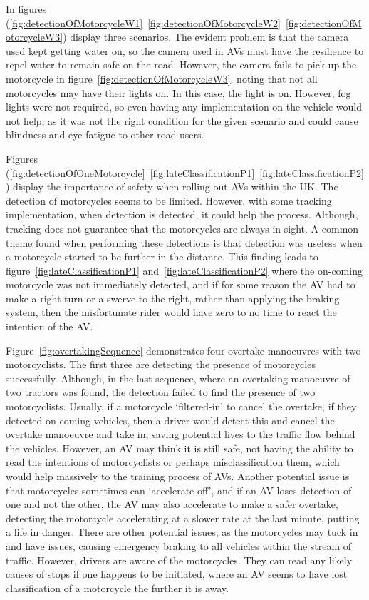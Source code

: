 \documentclass[conference]{IEEEtran}
\begin{document}
        In figures (\ref{fig:detectionOfMotorcycleW1}~\ref{fig:detectionOfMotorcycleW2}~\ref{fig:detectionOfMotorcycleW3}) display three scenarios. The evident problem is that the camera used kept getting water on, so the camera used in AVs must have the resilience to repel water to remain safe on the road. However, the camera fails to pick up the motorcycle in figure~\ref{fig:detectionOfMotorcycleW3}, noting that not all motorcycles may have their lights on. In this case, the light is on. However, fog lights were not required, so even having any implementation on the vehicle would not help, as it was not the right condition for the given scenario and could cause blindness and eye fatigue to other road users.

		Figures (\ref{fig:detectionOfOneMotorcycle}~\ref{fig:lateClassificationP1}~\ref{fig:lateClassificationP2}) display the importance of safety when rolling out AVs within the UK. The detection of motorcycles seems to be limited. However, with some tracking implementation, when detection is detected, it could help the process. Although, tracking does not guarantee that the motorcycles are always in sight. A common theme found when performing these detections is that detection was useless when a motorcycle started to be further in the distance. This finding leads to figure~\ref{fig:lateClassificationP1} and~\ref{fig:lateClassificationP2} where the on-coming motorcycle was not immediately detected, and if for some reason the AV had to make a right turn or a swerve to the right, rather than applying the braking system, then the misfortunate rider would have zero to no time to react the intention of the AV.

		Figure~\ref{fig:overtakingSequence} demonstrates four overtake manoeuvres with two motorcyclists. The first three are detecting the presence of motorcycles successfully. Although, in the last sequence, where an overtaking manoeuvre of two tractors was found, the detection failed to find the presence of two motorcyclists. Usually, if a motorcycle `filtered-in' to cancel the overtake, if they detected on-coming vehicles, then a driver would detect this and cancel the overtake manoeuvre and take in, saving potential lives to the traffic flow behind the vehicles. However, an AV may think it is still safe, not having the ability to read the intentions of motorcyclists or perhaps misclassification them, which would help massively to the training process of AVs. Another potential issue is that motorcycles sometimes can `accelerate off', and if an AV loses detection of one and not the other, the AV may also accelerate to make a safer overtake, detecting the motorcycle accelerating at a slower rate at the last minute, putting a life in danger. There are other potential issues, as the motorcycles may tuck in and have issues, causing emergency braking to all vehicles within the stream of traffic. However, drivers are aware of the motorcycles. They can read any likely causes of stops if one happens to be initiated, where an AV seems to have lost classification of a motorcycle the further it is away. 
		
\end{document}
